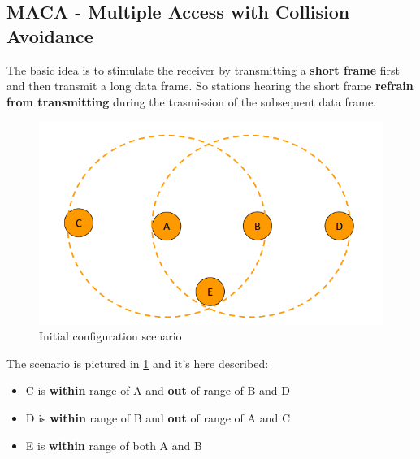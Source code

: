 \documentclass[10pt,a4paper]{report}
\theoremstyle{definition}
\begin{document}
\subsection{MACA - Multiple Access with Collision Avoidance}\label{sec:maca---multiple-access-with-collision-avoidance}
The basic idea is to stimulate the receiver by transmitting a \textbf{short frame} first and then transmit a long data frame. So stations hearing the short frame \textbf{refrain from transmitting} during the trasmission of the subsequent data frame.
\begin{figure}[h!]
	\centering\includegraphics[scale=0.50]{images/Pasted image 20230225101254.png}
	\caption{Initial configuration scenario}
	\label{maca-proto}
\end{figure}


The scenario is pictured in \ref{maca-proto} and it's here described:
\begin{itemize}
	\item 
	C is \textbf{within} range of A and \textbf{out} of range of B and D
	\item 
	D is \textbf{within} range of B and \textbf{out} of range of A and C
	\item 
	E is \textbf{within} range of both A and B
\end{itemize}
\end{document}
